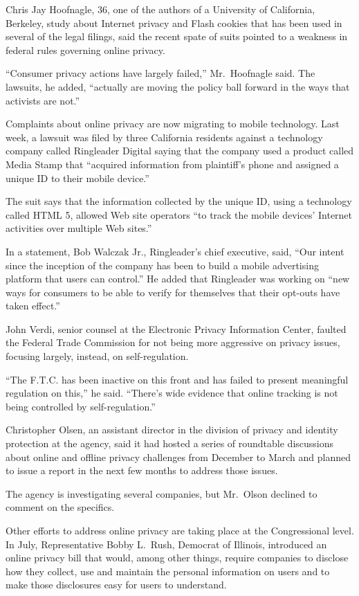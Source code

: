﻿\documentclass[12pt]{article}
\begin{document}
Chris Jay Hoofnagle, 36, one of the authors of a University of California, Berkeley, study about
Internet privacy and Flash cookies that has been used in several of the legal filings, said the
recent spate of suits pointed to a weakness in federal rules governing online privacy.

``Consumer privacy actions have largely failed,'' Mr.~Hoofnagle said. The lawsuits, he added,
``actually are moving the policy ball forward in the ways that activists are not.''

Complaints about online privacy are now migrating to mobile technology. Last week, a lawsuit was
filed by three California residents against a technology company called Ringleader Digital saying
that the company used a product called Media Stamp that ``acquired information from plaintiff's
phone and assigned a unique ID to their mobile device.''

The suit says that the information collected by the unique ID, using a technology called HTML 5,
allowed Web site operators ``to track the mobile devices' Internet activities over multiple Web
sites.''

In a statement, Bob Walczak Jr., Ringleader's chief executive, said, ``Our intent since the
inception of the company has been to build a mobile advertising platform that users can control.''
He added that Ringleader was working on ``new ways for consumers to be able to verify for themselves
that their opt-outs have taken effect.''

John Verdi, senior counsel at the Electronic Privacy Information Center, faulted the Federal Trade
Commission for not being more aggressive on privacy issues, focusing largely, instead, on
self-regulation.

``The F.T.C. has been inactive on this front and has failed to present meaningful regulation on
this,'' he said. ``There's wide evidence that online tracking is not being controlled by
self-regulation.''

Christopher Olsen, an assistant director in the division of privacy and identity protection at the
agency, said it had hosted a series of roundtable discussions about online and offline privacy
challenges from December to March and planned to issue a report in the next few months to address
those issues.

The agency is investigating several companies, but Mr.~Olson declined to comment on the specifics.

Other efforts to address online privacy are taking place at the Congressional level. In July,
Representative Bobby L.~Rush, Democrat of Illinois, introduced an online privacy bill that would,
among other things, require companies to disclose how they collect, use and maintain the personal
information on users and to make those disclosures easy for users to understand.
\end{document}
